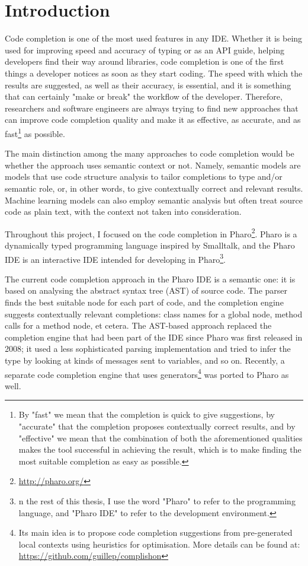 \documentclass[sigplan,screen]{acmart}
\begin{document}
\section{Introduction}
Code completion is one of the most used features in any IDE. Whether it is being used for improving speed and accuracy of typing or as an API guide, helping developers find their way around libraries, code completion is one of the first things a developer notices as soon as they start coding. The speed with which the results are suggested, as well as their accuracy, is essential, and it is something that can certainly "make or break" the workflow of the developer. Therefore, researchers and software engineers are always trying to find new approaches that can improve code completion quality and make it as effective, as accurate, and as fast\footnote{By "fast" we mean that the completion is quick to give suggestions, by "accurate" that the completion proposes contextually correct results, and by "effective" we mean that the combination of both the aforementioned qualities makes the tool successful in achieving the result, which is to make finding the most suitable completion as easy as possible.} as possible.

The main distinction among the many approaches to code completion would be whether the approach uses semantic context or not. Namely, semantic models are models that use code structure analysis to tailor completions to type and/or semantic role, or, in other words, to give contextually correct and relevant results. Machine learning models can also employ semantic analysis but often treat source code as plain text, with the context not taken into consideration.

Throughout this project, I focused on the code completion in Pharo\footnote{\url{http://pharo.org/}}. Pharo is a dynamically typed programming language inspired by Smalltalk, and the Pharo IDE is an interactive IDE intended for developing in Pharo\footnote{n the rest of this thesis, I use the word "Pharo" to refer to the programming language, and "Pharo IDE" to refer to the development environment.}.

The current code completion approach in the Pharo IDE is a semantic one: it is based on analysing the abstract syntax tree (AST) of source code. The parser finds the best suitable node for each part of code, and the completion engine suggests contextually relevant completions: class names for a global node, method calls for a method node, et cetera. The AST-based approach replaced the completion engine that had been part of the IDE since Pharo was first released in 2008; it used a less sophisticated parsing implementation and tried to infer the type by looking at kinds of messages sent to variables, and so on. Recently, a separate code completion engine that uses generators\footnote{Its main idea is to propose code completion suggestions from pre-generated local contexts using heuristics for optimisation. More details can be found at: \url{https://github.com/guillep/complishon}} was ported to Pharo as well.
\end{document}
